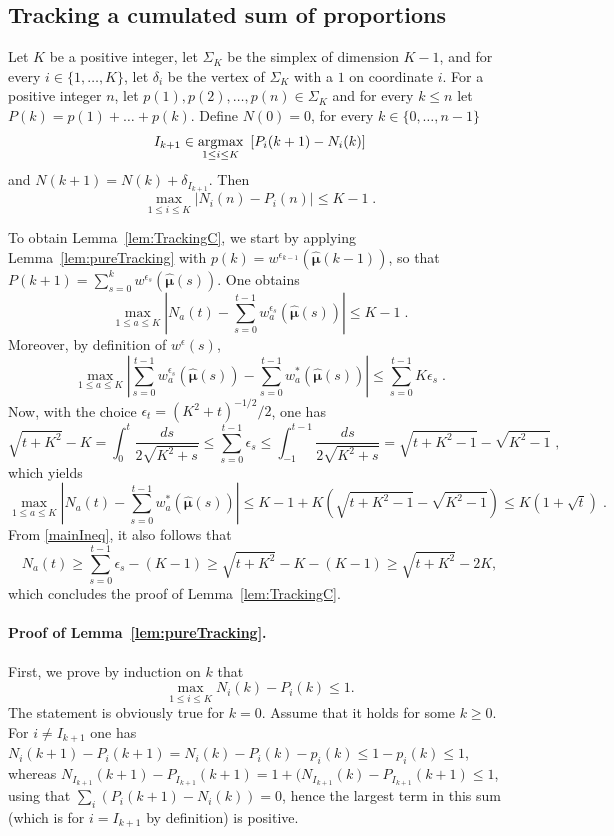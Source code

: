 \documentclass{colt2016} %
\begin{document}
\subsection{Tracking a cumulated sum of proportions}
\begin{lemma}\label{lem:pureTracking}
	Let $K$ be a positive integer, let $\Sigma_K$ be the simplex of dimension $K-1$, and for every $i\in\{1,\dots,K\}$, let $\delta_i$ be the vertex of $\Sigma_K$ with a $1$ on coordinate $i$.
	For a positive integer $n$, let $p(1), p(2),\dots, p(n)\in \Sigma_K$ and for every $k\leq n$ let $P(k) = p(1)+\dots+p(k)$.	
	Define $N(0)=0$, for every $k\in\{0,\dots,n-1\}$
	 \[I_{k+1} \in \underset{1\leq i\leq K}{\text{argmax}} \ \left[ P_{i}(k+1)-N_{i}(k)\right]\] and 
	$N({k+1}) = N({k}) + \delta_{I_{k+1}}$. Then
	\[\max_{1\leq i\leq K} \big|N_i(n)-P_i(n)\big| \leq K-1\;. \]
\end{lemma}
%
To obtain Lemma~\ref{lem:TrackingC}, we start by applying Lemma~\ref{lem:pureTracking} with $p(k) = w^{\epsilon_{k-1}}(\hat{\bm \mu}(k-1))$, so that $P({k+1}) = \sum_{s=0}^{k} w^{\epsilon_s}(\hat{\bm \mu}(s))$. One obtains
\begin{equation}\max_{1 \leq a \leq K} \left|N_a(t) - \sum_{s=0}^{t-1} w^{\epsilon_s}_a(\hat{\bm\mu}(s)) \right| \leq K-1\;.\label{mainIneq}\end{equation}
Moreover, by definition of $w^{\epsilon}(s)$,  
\[\max_{1 \leq a \leq K} \left|\sum_{s=0}^{t-1} w^{\epsilon_s}_a(\hat{\bm\mu}(s)) - \sum_{s=0}^{t-1} w^{*}_a(\hat{\bm\mu}(s))  \right| \leq \sum_{s=0}^{t-1} K \epsilon_s\;.\]
Now, with the choice $\epsilon_t = (K^2+t)^{-1/2}/2$, one has 
\[\sqrt{t+K^2} - K = \int_{0}^{t} \frac{ds}{2\sqrt{K^2+s}} \leq \sum_{s=0}^{t-1} \epsilon_s \leq \int_{-1}^{t-1} \frac{ds}{2\sqrt{K^2+s}} = \sqrt{t + K^2 -1} - \sqrt{K^2-1}\;,\]
which yields 
\[\max_{1 \leq a \leq K} \left|N_a(t) - \sum_{s=0}^{t-1} w^{*}_a(\hat{\bm\mu}(s)) \right| \leq K-1 + K\left(\sqrt{t + K^2 -1} - \sqrt{K^2-1}\right) \leq K(1 + \sqrt{t})\;.\]
From \eqref{mainIneq}, it also follows that 
\[N_a(t) \geq \sum_{s=0}^{t-1} \epsilon_s - (K-1) \geq  \sqrt{t+K^2} -K - (K-1)  \geq \sqrt{t+K^2} - 2K,\]
which concludes the proof of Lemma~\ref{lem:TrackingC}. 

\paragraph{Proof of Lemma~\ref{lem:pureTracking}.} First, we prove by induction on $k$ that  
\[\max_{1 \leq i \leq K} N_i(k) - P_i(k) \leq 1. \]
The statement is obviously true for $k=0$. Assume that it holds for some $k \geq 0$. For $i \neq I_{k+1}$ one has 
$N_{i}(k+1) - P_{i}(k+1) = N_i(k) - P_{i}(k) - p_i(k) \leq 1 - p_i(k) \leq 1$, whereas
$N_{I_{k+1}}(k+1) - P_{I_{k+1}}(k+1) = 1 + (N_{I_{k+1}}(k) - P_{I_{k+1}}(k+1) \leq 1$, using that $\sum_{i}(P_{i}(k+1) - N_i(k))=0$, hence the largest term in this sum (which is for $i=I_{k+1}$ by definition) is positive. 
\end{document}

